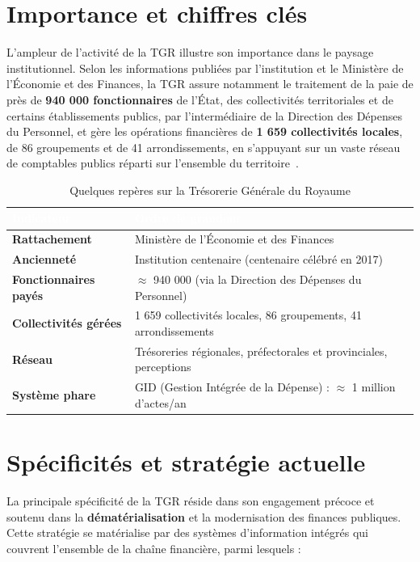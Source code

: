 \documentclass[a4paper,12pt,oneside]{report}
\newcommand{\thd}[1]{\textcolor{white}{\textbf{#1}}}
\begin{document}
\section{Importance et chiffres clés}
L'ampleur de l'activité de la TGR illustre son importance dans le paysage
institutionnel. Selon les informations publiées par l'institution et le
Ministère de l'Économie et des Finances, la TGR assure notamment le traitement
de la paie de près de \textbf{940 000 fonctionnaires} de l'État, des
collectivités territoriales et de certains établissements publics, par
l'intermédiaire de la Direction des Dépenses du Personnel, et gère les opérations
financières de \textbf{1 659 collectivités locales}, de 86 groupements et de 41
arrondissements, en s'appuyant sur un vaste réseau de comptables publics réparti
sur l'ensemble du territoire~\cite{tgr,mef}.

\begin{table}[H]
\centering
\begin{tabularx}{\linewidth}{>{\bfseries}l X}
\toprule
\rowcolor{gHead}\thd{Indicateur} & \thd{Ordre de grandeur} \\
\midrule
Rattachement & Ministère de l'Économie et des Finances \\
\rowcolor{gBand}
Ancienneté & Institution centenaire (centenaire célébré en 2017) \\
Fonctionnaires payés & $\approx$ 940 000 (via la Direction des Dépenses du Personnel) \\
\rowcolor{gBand}
Collectivités gérées & 1 659 collectivités locales, 86 groupements, 41 arrondissements \\
Réseau & Trésoreries régionales, préfectorales et provinciales, perceptions \\
\rowcolor{gBand}
Système phare & GID (Gestion Intégrée de la Dépense) : $\approx$ 1 million d'actes/an \\
\bottomrule
\end{tabularx}
\caption{Quelques repères sur la Trésorerie Générale du Royaume}
\label{tab:tgr}
\end{table}

\section{Spécificités et stratégie actuelle}
La principale spécificité de la TGR réside dans son engagement précoce et soutenu
dans la \textbf{dématérialisation} et la modernisation des finances publiques.
Cette stratégie se matérialise par des systèmes d'information intégrés qui
couvrent l'ensemble de la chaîne financière, parmi lesquels :
\end{document}
